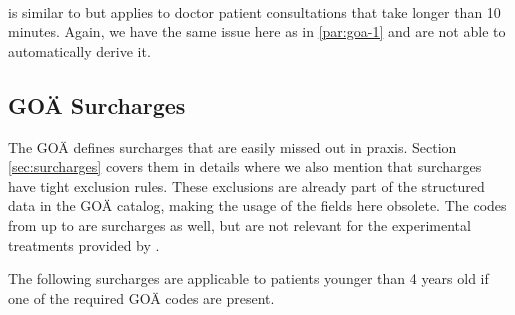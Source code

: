 \paragraph{}
 is similar to  but applies to doctor patient consultations that take longer than 10 minutes.
Again, we have the same issue here as in \ref{par:goa-1} and are not able to automatically derive it.





\subsection{GOÄ Surcharges}\label{subsec:goa-surcharges}
The GOÄ defines surcharges that are easily missed out in praxis.
Section \ref{sec:surcharges} covers them in details where we also mention that surcharges have tight exclusion rules.
These exclusions are already part of the structured data in the GOÄ catalog, making the usage of the  fields here obsolete.
The codes from  up to  are surcharges as well, but are not relevant for the experimental treatments provided by \AV.









The following surcharges are applicable to patients younger than 4 years old if one of the required GOÄ codes are present.



